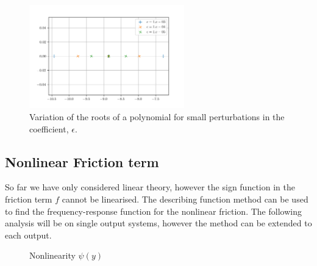 \documentclass{article}
\begin{document}
\begin{figure}[H]
  \centering
  \includegraphics[width=0.6\textwidth]{figures/pole_sensitivity.png}
  \caption{Variation of the roots of a polynomial for small perturbations in the coefficient, $\epsilon$.}
  \label{fig:pole_sensitivity}
\end{figure}

\subsection{Nonlinear Friction term}
So far we have only considered linear theory, however the sign function in the friction term $f$ cannot be linearised.
The describing function method can be used to find the frequency-response function for
the nonlinear friction.
The following analysis will be on single output systems, however the method can be extended to each output.

\begin{figure}[H]
  \centering
  \caption{Nonlinearity $\psi(y)$ }
  \label{fig:nonlinear_block_diagram}
\end{figure}
\end{document}
